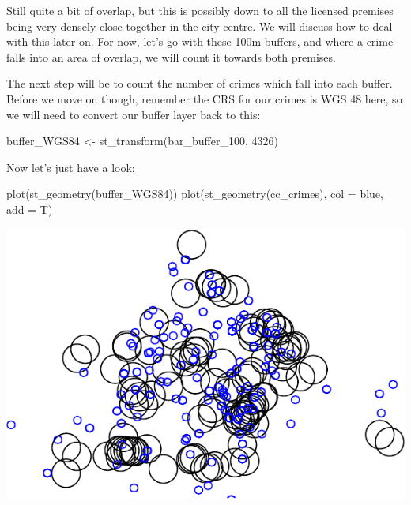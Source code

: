 \documentclass[
  krantz2]{krantz}
\makeatletter
\newenvironment{Shaded}{\begin{snugshade}}{\end{snugshade}}
\newcommand{\AttributeTok}[1]{\textcolor[rgb]{0.61,0.61,0.61}{#1}}
\newcommand{\DecValTok}[1]{\textcolor[rgb]{0.06,0.06,0.06}{#1}}
\newcommand{\FunctionTok}[1]{\textcolor[rgb]{0,0,0}{#1}}
\newcommand{\NormalTok}[1]{#1}
\newcommand{\OtherTok}[1]{\textcolor[rgb]{0.37,0.37,0.37}{#1}}
\newcommand{\StringTok}[1]{\textcolor[rgb]{0.5,0.5,0.5}{#1}}
\newenvironment{kframe}{%
\medskip{}
\setlength{\fboxsep}{.8em}
 \def\at@end@of@kframe{}%
 \ifinner\ifhmode%
  \def\at@end@of@kframe{\end{minipage}}%
  \begin{minipage}{\columnwidth}%
 \fi\fi%
 \def\FrameCommand##1{\hskip\@totalleftmargin \hskip-\fboxsep
 \colorbox{shadecolor}{##1}\hskip-\fboxsep
     \hskip-\linewidth \hskip-\@totalleftmargin \hskip\columnwidth}%
 \MakeFramed {\advance\hsize-\width
   \@totalleftmargin\z@ \linewidth\hsize
   \@setminipage}}%
 {\par\unskip\endMakeFramed%
 \at@end@of@kframe}
\renewenvironment{Shaded}{\begin{kframe}}{\end{kframe}}
\makeatother
\begin{document}
Still quite a bit of overlap, but this is possibly down to all the licensed premises being very densely close together in the city centre. We will discuss how to deal with this later on. For now, let's go with these 100m buffers, and where a crime falls into an area of overlap, we will count it towards both premises.

The next step will be to count the number of crimes which fall into each buffer. Before we move on though, remember the CRS for our crimes is WGS 48 here, so we will need to convert our buffer layer back to this:

\begin{Shaded}
\begin{Highlighting}[]
\NormalTok{buffer\_WGS84 }\OtherTok{\textless{}{-}} \FunctionTok{st\_transform}\NormalTok{(bar\_buffer\_100, }\DecValTok{4326}\NormalTok{)}
\end{Highlighting}
\end{Shaded}

Now let's just have a look:

\begin{Shaded}
\begin{Highlighting}[]
\FunctionTok{plot}\NormalTok{(}\FunctionTok{st\_geometry}\NormalTok{(buffer\_WGS84))}
\FunctionTok{plot}\NormalTok{(}\FunctionTok{st\_geometry}\NormalTok{(cc\_crimes), }\AttributeTok{col =} \StringTok{\textquotesingle{}blue\textquotesingle{}}\NormalTok{, }\AttributeTok{add =}\NormalTok{ T)}
\end{Highlighting}
\end{Shaded}

\includegraphics{crime_mapping_files/figure-latex/crimes_and_buffers-1.pdf}
\end{document}
